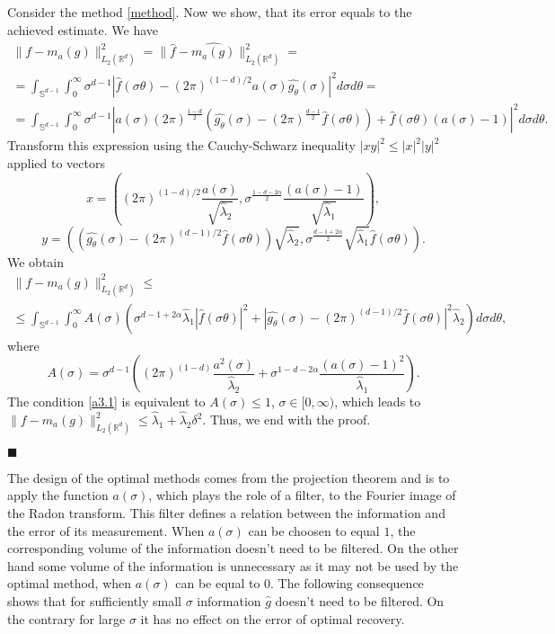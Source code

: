 \documentclass[12pt]{iopart}
\newenvironment{proof}
{\par\noindent{\bf Proof}}
{\hfill$\scriptstyle\blacksquare$}
\begin{document}
\begin{proof}
Consider the method \eqref{method}. Now we show, that its error equals to the achieved estimate.
We have
\begin{multline*}
  \|f-m_a(g)\|^2_{L_2(\mathbb R^d)}=\|\widehat f-\widehat{m_a(g)}\|^2_{L_2(\mathbb R^d)}=\\
  =\int_{\mathbb S^{d-1}}\int_0^\infty\sigma^{d-1}|\widehat f(\sigma\theta )-(2\pi)^{(1-d)/2}a(\sigma)\widehat{g_\theta }(\sigma)|^2d\sigma d\theta =\\
  =\int_{\mathbb
    S^{d-1}}\int_0^\infty\sigma^{d-1}\left|a(\sigma)(2\pi)^{\frac{1-d}{2}}\left(\widehat{g_\theta }(\sigma)-(2\pi)^{\frac{d-1}{2}}\widehat 
      f(\sigma\theta )\right)+\widehat
    f(\sigma\theta )(a(\sigma)-1)\right|^2d\sigma d\theta .
\end{multline*}
Transform this expression using the Cauchy-Schwarz inequality $|xy|^2\leqslant |x|^2|y|^2$ applied to vectors
\[
x=\left((2\pi)^{(1-d)/2}\frac{a(\sigma)}{\sqrt{\widehat\lambda_2}},\sigma^{\frac{1-d-2\alpha}{2}}\frac{(a(\sigma)-1)}{\sqrt{\widehat\lambda_1}}\right),
\]
\[
y=\left(\left(\widehat{g_\theta }(\sigma)-(2\pi)^{(d-1)/2}\widehat
    f(\sigma\theta )\right)\sqrt{\widehat\lambda_2},\sigma^{\frac{d-1+2\alpha}{2}}\sqrt{\widehat\lambda_1}\widehat
  f(\sigma\theta )\right).
\]
We obtain
\begin{multline*}  
  \|f-m_a(g)\|^2_{L_2(\mathbb R^d)}\leqslant  \\
  \leqslant \int_{\mathbb S^{d-1}}\int_0^\infty
  A(\sigma)\left(\sigma^{d-1+2\alpha}\widehat\lambda_1|\widehat
    f(\sigma\theta )|^2+\left|\widehat{g_\theta
      }(\sigma)-(2\pi)^{(d-1)/2}\widehat f(\sigma\theta
      )\right|^2\widehat\lambda_2\right)d\sigma d\theta ,
\end{multline*}
where
  \[
  A(\sigma)=\sigma^{d-1}\left((2\pi)^{(1-d)}\frac{a^2(\sigma)}{\widehat\lambda_2}+\sigma^{1-d-2\alpha}\frac{(a(\sigma)-1)^2}{\widehat\lambda_1}\right).
  \]
  The condition \eqref{a3.1} is equivalent to $A(\sigma)\leqslant 1$, $\sigma\in
  [0,\infty )$, which leads to $ \|f-m_a(g)\|^2_{L_2(\mathbb R^d)}\leqslant
  \widehat\lambda_1+\widehat\lambda_2\delta^2.$
Thus, we end with the proof.

\end{proof}

The design of the optimal methods comes from the projection theorem and is to apply the function $a(\sigma)$, which plays the role of a filter, to the Fourier image of the Radon transform. This filter defines a relation between the information and the error of its measurement. When $a(\sigma)$ can be choosen to equal $1$, the corresponding volume of the information doesn't need to be filtered. On the other hand some volume of the information is unnecessary as it may not be used by the optimal method, when $a(\sigma)$ can be equal to $0$.   The following consequence shows that for sufficiently small  $\sigma$ information $\hat g$ doesn't need to be filtered. On the contrary for large  $\sigma$ it has no effect on the error of optimal recovery.
\end{document}
